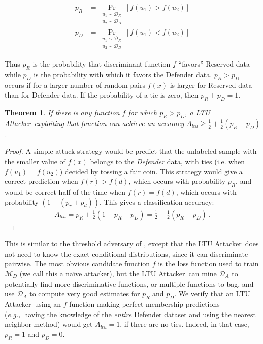 \documentclass[letterpaper]{article}
\newcommand{\eg}{{\em e.g.,~}}
\newcommand{\oracle}{LTU Attacker~}
\newtheorem{theorem}{Theorem}
\begin{document}
\begin{align}
p_R &= \mathop{Pr}_{\substack{u_1 \sim \mathcal{D}_R \\ u_2 \sim \mathcal{D}_D}}[f(u_1)>f(u_2)] \\
p_D &= \mathop{Pr}_{\substack{u_1 \sim \mathcal{D}_R \\ u_2 \sim \mathcal{D}_D}}[f(u_1)<f(u_2)]
\end{align}

Thus $p_R$ is the probability that discriminant function $f$ ``favors'' Reserved data while $p_D$ is the probability with which it favors the Defender data. $p_R  > p_D$ occurs if for a larger number of random pairs $f(x)$ is larger for Reserved data than for Defender data. If the probability of a tie is zero, then $p_R+p_D=1$.



\begin{theorem}\label{thm:pairwise}
If there is any function $f$ for which $p_R  > p_D$, a \oracle exploiting that function can achieve an accuracy $A_{ltu} \ge \frac{1}{2} + \frac{1}{2}(p_R - p_D)$.
\end{theorem}

\begin{proof}
A simple attack strategy would be predict that the unlabeled sample with the smaller value of $f(x)$ belongs to the {\em Defender} data, with ties (i.e. when $f(u_1)=f(u_2)$) decided by tossing a fair coin. This strategy would give a correct prediction when $f(r)>f(d)$, which occurs with probability $p_R$, and would be correct half of the time when $f(r)=f(d)$, which occurs with probability $(1-(p_r+p_d))$. This gives a classification accuracy:
\begin{align}
A_{ltu} = p_R + \frac{1}{2}(1- p_R- p_D)= \frac{1}{2} + \frac{1}{2}(p_R - p_D)~.
\end{align}
\end{proof}

This is similar to the threshold adversary of \cite{yeom2018privacy}, except that the \oracle does not need to know the exact conditional distributions, since it can discriminate pairwise. The most obvious candidate function $f$ is the loss function used to train $\mathcal{M}_D$ (we call this a na\"ive attacker), but the \oracle can mine $\mathcal{D}_A$ to potentially find more discriminative functions, or multiple functions to bag, and use $\mathcal{D}_A$ to compute very good estimates for $p_R$ and $p_D$. We verify that an \oracle using an $f$ function making perfect membership predictions (\eg having the knowledge of the {\em entire} Defender dataset and using the nearest neighbor method) would get $A_{ltu} = 1$, if there are no ties. Indeed, in that case, $p_R=1$ and $p_D=0$.
\end{document}
